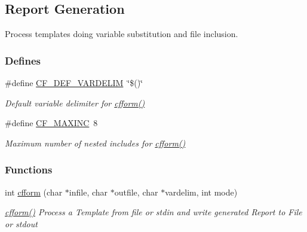 \hypertarget{group__report__generation}{\subsection{Report Generation}
\label{group__report__generation}
}


Process templates doing variable substitution and file inclusion.  


\subsubsection*{Defines}
\begin{DoxyCompactItemize}
\item 
\hypertarget{group__report__generation_ga5547641c939fd4d071e9aeaa7c956cac}{\#define \hyperlink{group__report__generation_ga5547641c939fd4d071e9aeaa7c956cac}{C\-F\-\_\-\-D\-E\-F\-\_\-\-V\-A\-R\-D\-E\-L\-I\-M}~\char`\"{}\$()\char`\"{}}\label{group__report__generation_ga5547641c939fd4d071e9aeaa7c956cac}

\begin{DoxyCompactList}\small\item\em Default variable delimiter for \hyperlink{group__report__generation_ga2695585ee0a7485da6075848fa27a33f}{cfform()} \end{DoxyCompactList}\item 
\hypertarget{group__report__generation_ga7b96ba1ca10909659d50eabb8b5af611}{\#define \hyperlink{group__report__generation_ga7b96ba1ca10909659d50eabb8b5af611}{C\-F\-\_\-\-M\-A\-X\-I\-N\-C}~8}\label{group__report__generation_ga7b96ba1ca10909659d50eabb8b5af611}

\begin{DoxyCompactList}\small\item\em Maximum number of nested includes for \hyperlink{group__report__generation_ga2695585ee0a7485da6075848fa27a33f}{cfform()} \end{DoxyCompactList}\end{DoxyCompactItemize}
\subsubsection*{Functions}
\begin{DoxyCompactItemize}
\item 
int \hyperlink{group__report__generation_ga2695585ee0a7485da6075848fa27a33f}{cfform} (char $\ast$infile, char $\ast$outfile, char $\ast$vardelim, int mode)
\begin{DoxyCompactList}\small\item\em \hyperlink{group__report__generation_ga2695585ee0a7485da6075848fa27a33f}{cfform()} Process a Template from file or {\ttfamily stdin} and write generated Report to File or {\ttfamily stdout} \end{DoxyCompactList}\end{DoxyCompactItemize}


